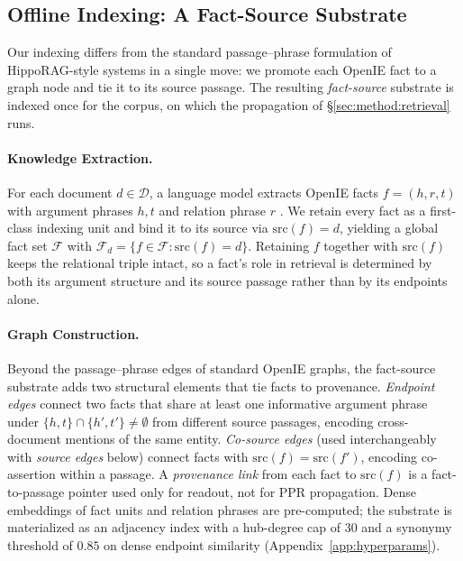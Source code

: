 \subsection{Offline Indexing: A Fact-Source Substrate}
\label{sec:method:substrate}

Our indexing differs from the standard passage--phrase formulation
of HippoRAG-style systems in a single move: we promote each OpenIE
fact to a graph node and tie it to its source passage. The
resulting \emph{fact-source} substrate is indexed once for the
corpus, on which the propagation of \S\ref{sec:method:retrieval}
runs.

\paragraph{Knowledge Extraction.}
For each document $d \in \mathcal{D}$, a language model extracts
OpenIE facts $f=(h,r,t)$ with argument phrases $h, t$ and relation
phrase $r$
\citep{angeli2015leveraging,gutierrez2025hipporag}. We retain every
fact as a first-class indexing unit and bind it to its source via
$\mathrm{src}(f)=d$, yielding a global fact set $\mathcal{F}$ with
$\mathcal{F}_d = \{f\in\mathcal{F} : \mathrm{src}(f)=d\}$. Retaining
$f$ together with $\mathrm{src}(f)$ keeps the relational triple
intact, so a fact's role in retrieval is determined by both its
argument structure and its source passage rather than by its
endpoints alone.

\paragraph{Graph Construction.}
Beyond the passage--phrase edges of standard OpenIE graphs, the
fact-source substrate adds two structural elements that tie facts
to provenance. \emph{Endpoint edges} connect two facts that share
at least one informative argument phrase under
$\{h,t\}\cap\{h',t'\}\neq\emptyset$ from different source passages,
encoding cross-document mentions of the same entity.
\emph{Co-source edges} (used interchangeably with \emph{source
edges} below) connect facts with
$\mathrm{src}(f)=\mathrm{src}(f')$, encoding co-assertion within a
passage. A \emph{provenance link} from each fact to
$\mathrm{src}(f)$ is a fact-to-passage pointer used only for
readout, not for PPR propagation. Dense embeddings of fact units
and relation phrases are pre-computed; the substrate is
materialized as an adjacency index with a hub-degree cap of $30$
and a synonymy threshold of $0.85$ on dense endpoint similarity
(Appendix~\ref{app:hyperparams}).

